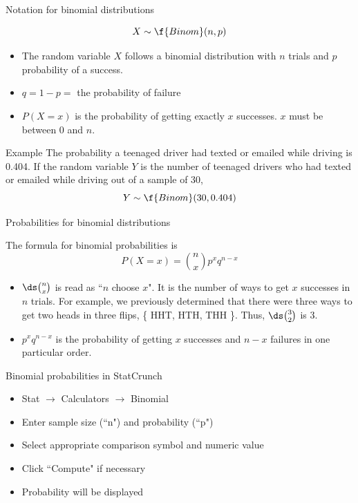 \documentclass[xcolor=table, handout]{beamer}
\begin{document}
\begin{frame}{Notation for binomial distributions}
\begin{block}{}
\[X \sim \f{Binom}(n,p)\]
\begin{itemize}
\pause\item The random variable $X$ follows a binomial distribution with $n$ trials and $p$ probability of a success.
\pause\item $q = 1- p =$ the probability of failure
\pause\item $P(X=x)$ is the probability of getting exactly $x$ successes. $x$ must be between 0 and $n$.
\end{itemize}
\end{block}
\pause
\begin{exampleblock}{Example}
The probability a teenaged driver had texted or emailed while driving is 0.404. If the random variable $Y$ is the number of teenaged drivers who had texted or emailed while driving out of a sample of 30,
\[Y \sim \f{Binom}(30, 0.404)\]
\end{exampleblock}
\end{frame}

\begin{frame}{Probabilities for binomial distributions}
\begin{block}{}
The formula for binomial probabilities is
\[ P(X=x) = \binom n x p^x q^{n-x}\]
\begin{itemize}
\pause\item $\ds \binom n x$ is read as ``$n$ choose $x$". It is the number of ways to get $x$ successes in $n$ trials. For example, we previously determined that there were three ways to get two heads in three flips, \{ HHT, HTH, THH \}. Thus, $\ds \binom 3 2$ is 3.
\pause\item $p^x q^{n-x}$ is the probability of getting $x$ successes and $n-x$ failures in one particular order.
\end{itemize}
\end{block}
\end{frame}

\begin{frame}{Binomial probabilities in StatCrunch}
\begin{block}{}
\begin{itemize}
\item Stat $\to$ Calculators $\to$ Binomial
\item Enter sample size (``n") and probability (``p")
\item Select appropriate comparison symbol and numeric value
\item Click ``Compute" if necessary
\item Probability will be displayed
\end{itemize}
\end{block}
\end{frame}
\end{document}
